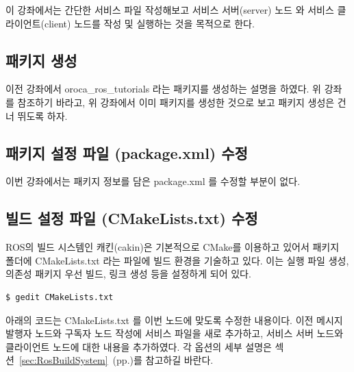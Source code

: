 이 강좌에서는 간단한 서비스 파일 작성해보고 서비스 서버(server) 노드 와 서비스 클라이언트(client) 노드를 작성 및 실행하는 것을 목적으로 한다.

\subsection{패키지 생성}

이전 강좌에서 oroca\_ros\_tutorials 라는 패키지를 생성하는 설명을 하였다. 위 강좌를 참조하기 바라고, 위 강좌에서 이미 패키지를 생성한 것으로 보고 패키지 생성은 건너 뛰도록 하자.

\subsection{패키지 설정 파일 (package.xml) 수정}

이번 강좌에서는 패키지 정보를 담은 package.xml 를 수정할 부분이 없다.

\subsection{빌드 설정 파일 (CMakeLists.txt) 수정}

ROS의 빌드 시스템인 캐킨(cakin)은 기본적으로 CMake를 이용하고 있어서 패키지 폴더에 CMakeLists.txt 라는 파일에 빌드 환경을 기술하고 있다. 이는 실행 파일 생성, 의존성 패키지 우선 빌드, 링크 생성 등을 설정하게 되어 있다.

\begin{lstlisting}[language=ROS]
$ gedit CMakeLists.txt 
\end{lstlisting}

아래의 코드는 CMakeLists.txt 를 이번 노드에 맞도록 수정한 내용이다. 이전 메시지 발행자 노드와 구독자 노드 작성에 서비스 파일을 새로 추가하고, 서비스 서버 노드와 클라이언트 노드에 대한 내용을 추가하였다. 각 옵션의 세부 설명은 섹션~\ref{sec:RosBuildSystem}~(pp.\pageref{sec:RosBuildSystem})를 참고하길 바란다.

